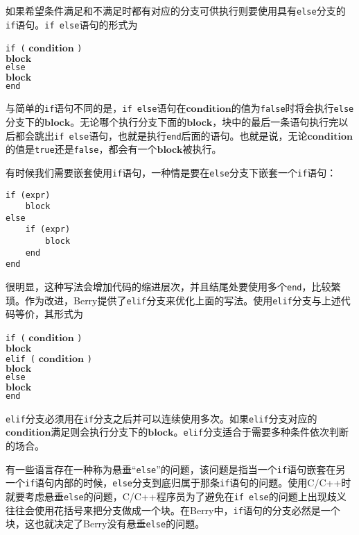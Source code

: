 如果希望条件满足和不满足时都有对应的分支可供执行则要使用具有\texttt{else}分支的\texttt{if}语句。\texttt{if else}语句的形式为
\begin{algorithm}
    \texttt{if (} $\bm{condition}$ \texttt{)} \\
        \qquad $\bm{block}$ \\
    \texttt{else} \\
        \qquad $\bm{block}$ \\
    \texttt{end}
\end{algorithm}

与简单的\texttt{if}语句不同的是，\texttt{if else}语句在$\bm{condition}$的值为\texttt{false}时将会执行\texttt{else}分支下的$\bm{block}$。无论哪个执行分支下面的$\bm{block}$，块中的最后一条语句执行完以后都会跳出\texttt{if else}语句，也就是执行\texttt{end}后面的语句。也就是说，无论$\bm{condition}$的值是\texttt{true}还是\texttt{false}，都会有一个$\bm{block}$被执行。

有时候我们需要嵌套使用\texttt{if}语句，一种情是要在\texttt{else}分支下嵌套一个\texttt{if}语句：
\begin{lstlisting}[language=berry, numbers=none]
if (expr)
    block
else
    if (expr)
        block
    end
end
\end{lstlisting}
很明显，这种写法会增加代码的缩进层次，并且结尾处要使用多个\texttt{end}，比较繁琐。作为改进，Berry提供了\texttt{elif}分支来优化上面的写法。使用\texttt{elif}分支与上述代码等价，其形式为
\begin{algorithm}
    \texttt{if (} $\bm{condition}$ \texttt{)} \\
        \qquad $\bm{block}$ \\
    \texttt{elif (} $\bm{condition}$ \texttt{)} \\
        \qquad $\bm{block}$ \\
    \texttt{else} \\
    \qquad $\bm{block}$ \\
    \texttt{end}
\end{algorithm}

\texttt{elif}分支必须用在\texttt{if}分支之后并可以连续使用多次。如果\texttt{elif}分支对应的$\bm{condition}$满足则会执行分支下的$\bm{block}$。\texttt{elif}分支适合于需要多种条件依次判断的场合。

有一些语言存在一种称为悬垂``\texttt{else}''的问题，该问题是指当一个\texttt{if}语句嵌套在另一个\texttt{if}语句内部的时候，\texttt{else}分支到底归属于那条\texttt{if}语句的问题。使用C/C++时就要考虑悬垂\texttt{else}的问题，C/C++程序员为了避免在\texttt{if else}的问题上出现歧义往往会使用花括号来把分支做成一个块。在Berry中，\texttt{if}语句的分支必然是一个块，这也就决定了Berry没有悬垂\texttt{else}的问题。

